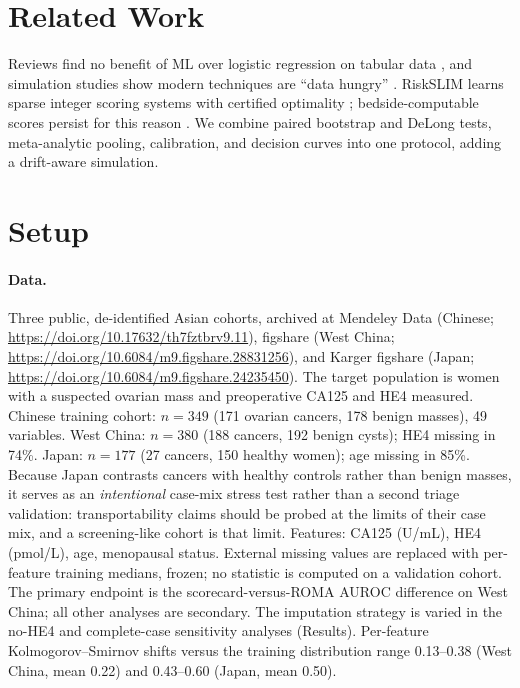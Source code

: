\documentclass[pmlr,twocolumn,10pt]{jmlr} %
\begin{document}
\section{Related Work}

Reviews find no benefit of ML over logistic regression on tabular data
\citep{christodoulou2019}, and simulation studies show modern techniques
are ``data hungry'' \citep{vanderploeg2014,riley2020}. RiskSLIM learns
sparse integer scoring systems with certified optimality
\citep{ustun2016}; bedside-computable scores persist for this reason
\citep{caruana2015,rudin2019}. We combine paired bootstrap and DeLong tests, meta-analytic pooling,
calibration, and decision curves
\citep{delong1988,hanley1983,dersimonian1986,vancalster2019,vickers2006}
into one protocol, adding a drift-aware simulation.

\section{Setup}

\paragraph{Data.} Three public, de-identified Asian cohorts, archived at
Mendeley Data (Chinese; \url{https://doi.org/10.17632/th7fztbrv9.11}),
figshare (West China; \url{https://doi.org/10.6084/m9.figshare.28831256}),
and Karger figshare (Japan; \url{https://doi.org/10.6084/m9.figshare.24235450}).
The target population is women with a suspected ovarian mass and
preoperative CA125 and HE4 measured. Chinese training cohort: $n=349$ (171
ovarian cancers, 178 benign masses), 49 variables. West China: $n=380$ (188
cancers, 192 benign cysts); HE4 missing in 74\%. Japan: $n=177$ (27
cancers, 150 healthy women); age missing in 85\%. Because Japan contrasts cancers with healthy controls rather than
benign masses, it serves as an \emph{intentional} case-mix stress test
rather than a second triage validation: transportability claims should be
probed at the limits of their case mix, and a screening-like cohort is that
limit. Features: CA125 (U/mL), HE4 (pmol/L), age, menopausal status. External
missing values are replaced with per-feature training medians, frozen; no
statistic is computed on a validation cohort. The primary endpoint is the scorecard-versus-ROMA AUROC difference on
West China; all other analyses are secondary. The imputation strategy is
varied in the no-HE4 and complete-case sensitivity analyses (Results). Per-feature
Kolmogorov--Smirnov shifts versus the training distribution range
0.13--0.38 (West China, mean 0.22) and 0.43--0.60 (Japan, mean 0.50).
\end{document}
